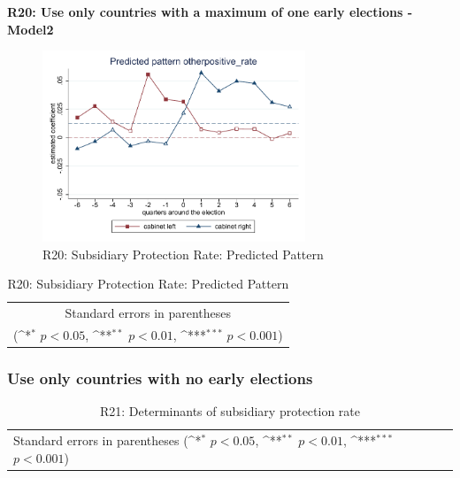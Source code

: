 \documentclass[10pt,a4paper]{scrartcl}
\begin{document}
\clearpage
\textbf{R20: Use only countries with a maximum of one early elections - Model2}
\begin{figure}[!ht]
	\centering
	\includegraphics[width=0.7\textwidth]{figures_edited/otherpositive_rate_graph2_R20.pdf}
	\caption{R20: Subsidiary Protection Rate: Predicted Pattern}
\end{figure}

\begin{table}[!ht]\centering
	\footnotesize
	\renewcommand{\arraystretch}{1.15}
	\def\sym#1{\ifmmode^{#1}\else\(^{#1}\)\fi}
	\caption{R20: Subsidiary Protection Rate: Predicted Pattern}
	\begin{tabular}{l*{2}{c}}
		\hline\hline
		
		\hline\hline
		\multicolumn{3}{c}{\footnotesize Standard errors in parentheses} \\
		\multicolumn{3}{c}{\footnotesize (\sym{*} \(p<0.05\), \sym{**} \(p<0.01\), \sym{***} \(p<0.001\))} \\
	\end{tabular}
\end{table}




\clearpage
\FloatBarrier
\subsubsection{Use only countries with no early elections}
\begin{table}[!ht]\centering
	\renewcommand{\arraystretch}{1.25}
	\small
	\def\sym#1{\ifmmode^{#1}\else\(^{#1}\)\fi}
	\caption{R21: Determinants of subsidiary protection rate}
	\begin{tabular}{l*{3}{c}}
		\hline\hline
		
		\hline\hline
		\multicolumn{4}{l}{\footnotesize Standard errors in parentheses (\sym{*} \(p<0.05\), \sym{**} \(p<0.01\), \sym{***} \(p<0.001\))}\\
	\end{tabular}
\end{table}
\end{document}
